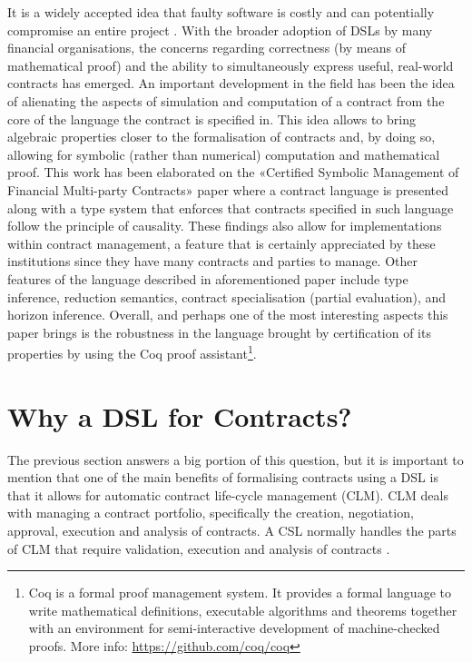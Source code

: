 \documentclass{ituthesis}
\begin{document}
It is a widely accepted idea that faulty software is costly and can potentially compromise an entire project \cite{expensivesoftware}. With the broader adoption of DSLs by many financial organisations, the concerns regarding correctness (by means of mathematical proof) and the ability to simultaneously express useful, real-world contracts has emerged. An important development in the field has been the idea of alienating the aspects of simulation and computation of a contract from the core of the language the contract is specified in. This idea allows to bring algebraic properties closer to the formalisation of contracts and, by doing so, allowing for symbolic (rather than numerical) computation and mathematical proof. This work has been elaborated on the «Certified Symbolic Management of Financial Multi-party Contracts» paper \cite{bahr2015certified} where a contract language is presented along with a type system that enforces that contracts specified in such language follow the principle of causality. These findings also allow for implementations within contract management, a feature that is certainly appreciated by these institutions since they have many contracts and parties to manage. Other features of the language described in aforementioned paper include type inference, reduction semantics, contract specialisation (partial evaluation), and horizon inference. Overall, and perhaps one of the most interesting aspects this paper brings is the robustness in the language brought by certification of its properties by using the Coq proof
assistant\footnote{Coq is a formal proof management system. It provides a formal language to write mathematical definitions, executable algorithms and theorems together with an environment for semi-interactive development of machine-checked proofs. More info: \url{https://github.com/coq/coq}}.

\section{Why a DSL for Contracts?}
The previous section answers a big portion of this question, but it is important to mention that one of the main benefits of formalising contracts using a DSL is that it allows for automatic contract life-cycle management (CLM). CLM deals with managing a contract portfolio, specifically the creation, negotiation, approval, execution and analysis of contracts. A CSL normally handles the parts of CLM that require validation, execution and analysis of contracts \cite{hvitved2011contract}.
\end{document}
